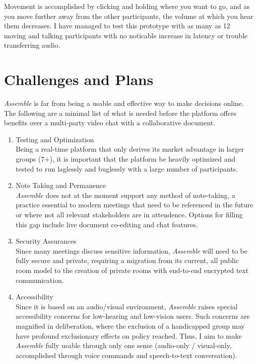 \documentclass{article}
\begin{document}
Movement is accomplished by clicking and holding where you want to go, and as you move further
away from the other participants, the volume at which you hear them decreases. I have
managed to test this prototype with as many as 12 moving and talking participants with
no noticable increase in latency or trouble transferring audio.

\section{Challenges and Plans}

\textit{Assemble} is far from being a usable and effective way to make
decisions online. The following are a minimal list of what is needed before
the platform offers benefits over a multi-party video chat with a collaborative
document.

\begin{enumerate}
  \item Testing and Optimization \\
  Being a real-time platform that only derives its market advantage in larger groups (7+),
  it is important that the platform be heavily optimized and tested to run laglessly
  and buglessly with a large number of participants.
  \item Note Taking and Permanence \\
  \textit{Assemble} does not at the moment support any method of note-taking, a practice essential
  to modern meetings that need to be referenced in the future or where not all relevant
  stakeholders are in attendence. Options for filling this gap include live document
  co-editing and chat features.
  \item Security Assurances \\
  Since many meetings discuss sensitive information, \textit{Assemble} will need
  to be fully secure and private, requiring a migration from its current, all public
  room model to the creation of private rooms with end-to-end encrypted text communication.
  \item Accessibility \\
  Since it is based on an audio/visual environment, \textit{Assemble} raises special
  accessibility concerns for low-hearing and low-vision users. Such concerns are magnified
  in deliberation, where the exclusion of a handicapped group may have profound exclusionary
  effects on policy reached. Thus, I aim to make \textit{Assemble} fully usable through
  only one sense (audio-only / visual-only, accomplished through voice commands and
  speech-to-text conversation).
\end{enumerate}
\end{document}
